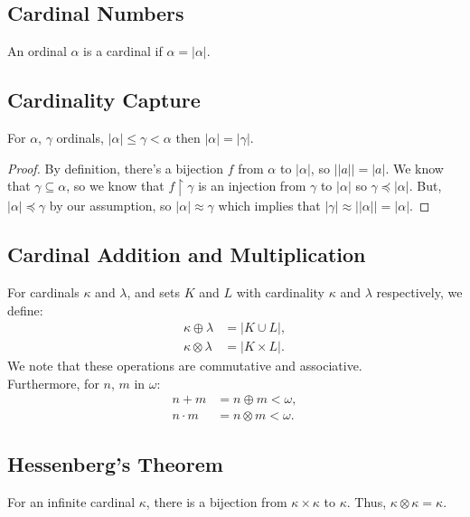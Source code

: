\subsection{Cardinal Numbers}

An ordinal $\alpha$ is a cardinal if $\alpha = |\alpha|$.

\subsection{Cardinality Capture}

For $\alpha$, $\gamma$ ordinals,
$|\alpha| \leq \gamma < \alpha$ then $|\alpha| = |\gamma|$.

\begin{proof}
    By definition, there's a bijection $f$ from $\alpha$
    to $|\alpha|$, so $||a|| = |a|$. We know that $\gamma
    \subseteq \alpha$, so we know that
    $f \upharpoonright \gamma$ is an injection from $\gamma$ to 
    $|\alpha|$ so $\gamma \preceq |\alpha|$. But, 
    $|\alpha| \preceq \gamma$ by our assumption,
    so $|\alpha| \approx \gamma$ which implies that
    $|\gamma| \approx ||\alpha|| = |\alpha|$.
\end{proof}

\subsection{Cardinal Addition and Multiplication}

For cardinals $\kappa$ and $\lambda$, and sets $K$ and $L$ with cardinality
$\kappa$ and $\lambda$ respectively, we define: \begin{align*}
    \kappa \oplus \lambda &= |K \cup L|, \tag{for $K$, $L$ disjoint} \\
    \kappa \otimes \lambda &= |K \times L|.
\end{align*} We note that these operations are commutative and associative.
\\[\baselineskip]
Furthermore, for $n$, $m$ in $\omega$: \begin{align*}
    n + m &= n \oplus m < \omega, \\
    n \cdot m &= n \otimes m < \omega.
\end{align*}

\subsection{Hessenberg's Theorem}

For an infinite cardinal $\kappa$, there is a bijection from $\kappa \times \kappa$
to $\kappa$. Thus, $\kappa \otimes \kappa = \kappa$.


